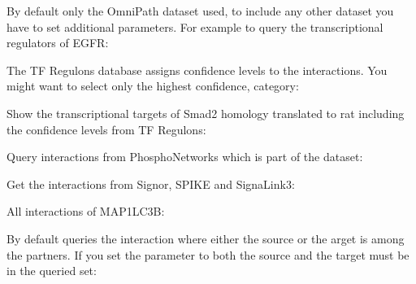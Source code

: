 \documentclass[letterpaper,10pt,english]{sphinxmanual}
\begin{document}
By default only the OmniPath dataset used, to include any other dataset you
have to set additional parameters. For example to query the transcriptional regulators of EGFR:
\begin{quote}

\end{quote}

The TF Regulons database assigns confidence levels to the interactions. You
might want to select only the highest confidence,  category:
\begin{quote}

\end{quote}

Show the transcriptional targets of Smad2 homology translated to rat including
the confidence levels from TF Regulons:
\begin{quote}

\end{quote}

Query interactions from PhosphoNetworks which is part of the 
dataset:
\begin{quote}

\end{quote}

Get the interactions from Signor, SPIKE and SignaLink3:
\begin{quote}

\end{quote}

All interactions of MAP1LC3B:
\begin{quote}

\end{quote}

By default  queries the interaction where either the source or the
arget is among the partners. If you set the  parameter to
 both the source and the target must be in the queried set:
\begin{quote}

\end{quote}
\end{document}
